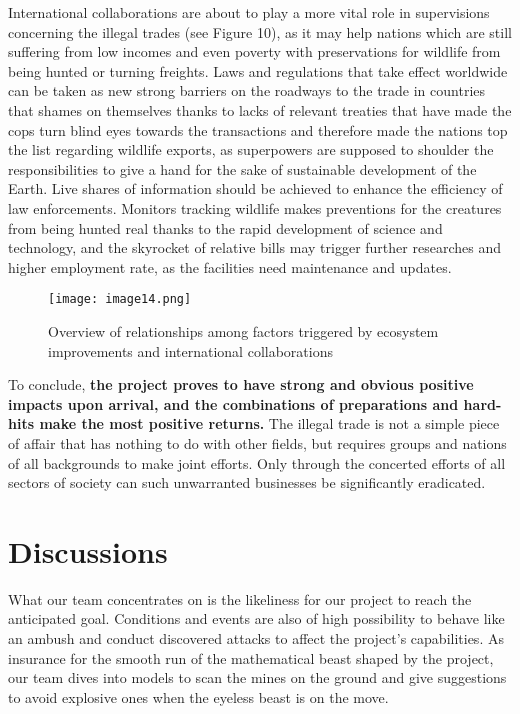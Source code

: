 \documentclass[12pt]{article}
\begin{document}
International collaborations are about to play a more vital role in supervisions concerning the illegal trades (see Figure 10), as it may help nations which are still suffering from low incomes and even poverty with preservations for wildlife from being hunted or turning freights. Laws and regulations that take effect worldwide can be taken as new strong barriers on the roadways to the trade in countries that shames on themselves thanks to lacks of relevant treaties that have made the cops turn blind eyes towards the transactions and therefore made the nations top the list regarding wildlife exports, as superpowers are supposed to shoulder the responsibilities to give a hand for the sake of sustainable development of the Earth. Live shares of information should be achieved to enhance the efficiency of law enforcements. Monitors tracking wildlife makes preventions for the creatures from being hunted real thanks to the rapid development of science and technology, and the skyrocket of relative bills may trigger further researches and higher employment rate, as the facilities need maintenance and updates.

\begin{figure}[htbp]
\centering
	\texttt{[image: image14.png]}
	\caption{Overview of relationships among factors triggered by ecosystem improvements and international collaborations }
\end{figure}

To conclude, \textbf{the project proves to have strong and obvious positive impacts upon arrival, and the combinations of preparations and hard-hits make the most positive returns.} The illegal trade is not a simple piece of affair that has nothing to do with other fields, but requires groups and nations of all backgrounds to make joint efforts. Only through the concerted efforts of all sectors of society can such unwarranted businesses be significantly eradicated.
\clearpage
\section{Discussions}
What our team concentrates on is the likeliness for our project to reach the anticipated goal. Conditions and events are also of high possibility to behave like an ambush and conduct discovered attacks to affect the project's capabilities. As insurance for the smooth run of the mathematical beast shaped by the project, our team dives into models to scan the mines on the ground and give suggestions to avoid explosive ones when the eyeless beast is on the move.
\end{document}
